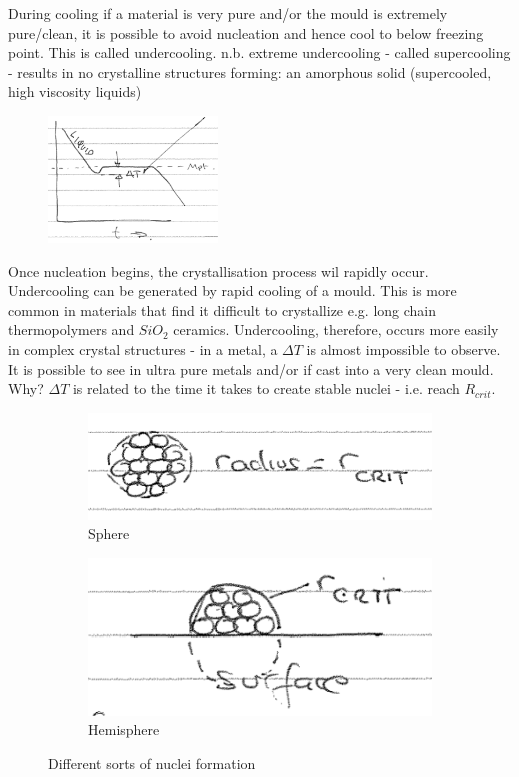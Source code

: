 \documentclass[class=report, crop=false, 12pt,a4paper]{standalone}
\begin{document}
During cooling if a material is very pure and/or the mould is extremely pure/clean, it is possible to avoid nucleation and hence cool to below freezing point. This is called undercooling. n.b. extreme undercooling - called supercooling - results in no crystalline structures forming: an amorphous solid (supercooled, high viscosity liquids)
\begin{figure}[h!]
  \centering
  \includegraphics[width = 0.4\textwidth]{../img/supercooling}
\end{figure}
Once nucleation begins, the crystallisation process wil rapidly occur. Undercooling can be generated by rapid cooling of a mould. This is more common in materials that find it difficult to crystallize e.g. long chain thermopolymers and $SiO_2$ ceramics. Undercooling, therefore, occurs more easily in complex crystal structures - in a metal, a $\Delta T$ is almost impossible to observe. It is possible to see in ultra pure metals and/or if cast into a very clean mould. Why? $\Delta T$ is related to the time it takes to create stable nuclei - i.e. reach $R_{crit}$.
\begin{figure}[h!]
  \centering
  \begin{subfigure}[b]{0.49\textwidth}
      \includegraphics[width=\textwidth]{../img/rcritfull}
      \caption{Sphere}
      \label{fig:rcritfull}
  \end{subfigure}
  \begin{subfigure}[b]{0.49\textwidth}
      \includegraphics[width=\textwidth]{../img/rcrithalf}
      \caption{Hemisphere}
      \label{fig:rcrithalf}
  \end{subfigure}
  \caption{Different sorts of nuclei formation}
\end{figure}
\end{document}
